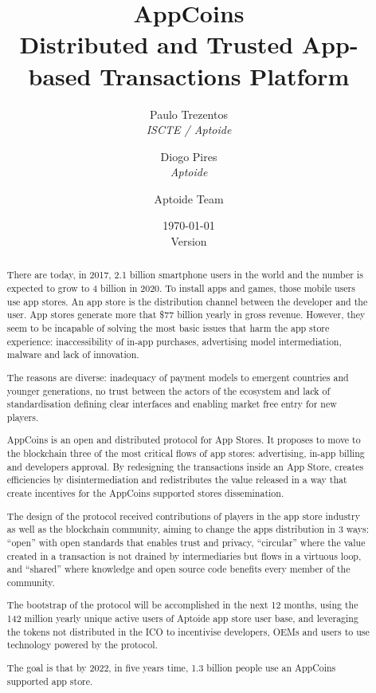 \documentclass[12pt, a4paper, titlepage]{article}
\title{AppCoins\\ Distributed and Trusted App-based Transactions Platform}
\author{\small Paulo Trezentos  \\
  {\em  ISCTE / Aptoide}  \\
  \and 
\small  Diogo Pires \\
  {\em Aptoide} \\
  \and
  Aptoide Team
  }
\date{\today\\\normalsize Version \versionnumber}
\begin{document}
\maketitle


\begin{abstract}

There are today, in 2017, 2.1 billion smartphone users in the world and the number is expected to grow to  4 billion in 2020. To install apps and games, those mobile users use app stores. An app store is the distribution channel between the developer and the user. App stores generate more that \$77 billion yearly in gross revenue.  However, they seem to be incapable of solving the most basic issues that harm the app store experience: inaccessibility of in-app purchases, advertising model intermediation, malware and lack of innovation.

The reasons are diverse: inadequacy of payment models to emergent countries and younger generations, no trust between the actors of the ecosystem and lack of standardisation defining clear interfaces and enabling market free entry for new players.

AppCoins is an open and distributed protocol for App Stores. It proposes to move to the blockchain three of the most critical flows of app stores: advertising, in-app billing and developers approval. By redesigning the transactions inside an App Store, creates efficiencies by disintermediation and redistributes the value released in a way that create incentives for the AppCoins supported stores dissemination.

The design of the protocol received contributions of players in the app store industry as well as the blockchain community, aiming to change the apps distribution in 3 ways: ``open'' with open standards that enables trust and privacy, ``circular'' where the value created in a transaction is not drained by intermediaries but flows in a virtuous loop, and ``shared'' where knowledge and open source code benefits every member of the community.

The bootstrap of the protocol will be accomplished in the next 12 months, using the 142 million yearly unique active users of Aptoide app store user base, and leveraging the tokens not distributed in the ICO to incentivise developers, OEMs and users to use technology powered by the protocol.

The goal is that by 2022, in five years time, 1.3 billion people use an AppCoins supported app store.


\end{abstract}
\end{document}
